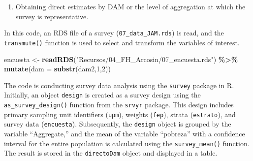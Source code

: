 \documentclass[
  12pt,
]{book}
\newenvironment{Shaded}{\begin{snugshade}}{\end{snugshade}}
\newcommand{\AttributeTok}[1]{\textcolor[rgb]{0.13,0.29,0.53}{#1}}
\newcommand{\DecValTok}[1]{\textcolor[rgb]{0.00,0.00,0.81}{#1}}
\newcommand{\FunctionTok}[1]{\textcolor[rgb]{0.13,0.29,0.53}{\textbf{#1}}}
\newcommand{\NormalTok}[1]{#1}
\newcommand{\OtherTok}[1]{\textcolor[rgb]{0.56,0.35,0.01}{#1}}
\newcommand{\SpecialCharTok}[1]{\textcolor[rgb]{0.81,0.36,0.00}{\textbf{#1}}}
\newcommand{\StringTok}[1]{\textcolor[rgb]{0.31,0.60,0.02}{#1}}
\providecommand{\tightlist}{%
  \setlength{\itemsep}{0pt}\setlength{\parskip}{0pt}}
\begin{document}
\begin{enumerate}
\def\labelenumi{\arabic{enumi}.}
\setcounter{enumi}{1}
\tightlist
\item
  Obtaining direct estimates by DAM or the level of aggregation at which the survey is representative.
\end{enumerate}

In this code, an RDS file of a survey (\texttt{07\_data\_JAM.rds}) is read, and the \texttt{transmute()} function is used to select and transform the variables of interest.

\begin{Shaded}
\begin{Highlighting}[]
\NormalTok{encuesta }\OtherTok{\textless{}{-}} \FunctionTok{readRDS}\NormalTok{(}\StringTok{"Recursos/04\_FH\_Arcosin/07\_encuesta.rds"}\NormalTok{) }\SpecialCharTok{\%\textgreater{}\%} 
   \FunctionTok{mutate}\NormalTok{(}\AttributeTok{dam =} \FunctionTok{substr}\NormalTok{(dam2,}\DecValTok{1}\NormalTok{,}\DecValTok{2}\NormalTok{))}
\end{Highlighting}
\end{Shaded}

The code is conducting survey data analysis using the \texttt{survey} package in R. Initially, an object \texttt{design} is created as a survey design using the \texttt{as\_survey\_design()} function from the \texttt{srvyr} package. This design includes primary sampling unit identifiers (\texttt{upm}), weights (\texttt{fep}), strata (\texttt{estrato}), and survey data (\texttt{encuesta}). Subsequently, the \texttt{design} object is grouped by the variable ``Aggregate,'' and the mean of the variable ``pobreza'' with a confidence interval for the entire population is calculated using the \texttt{survey\_mean()} function. The result is stored in the \texttt{directoDam} object and displayed in a table.
\end{document}
